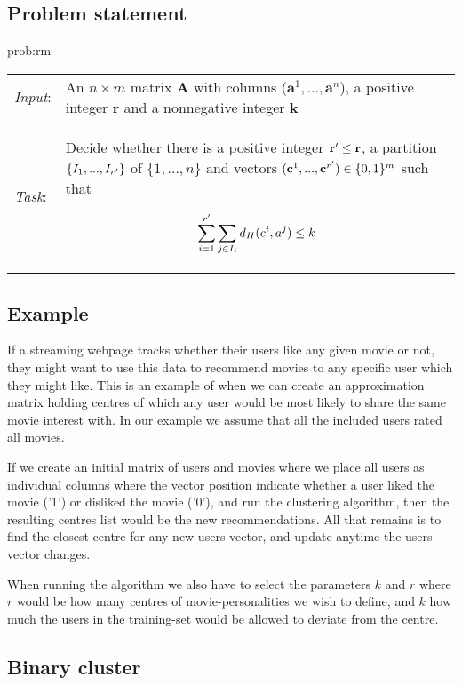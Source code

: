 \documentclass[a4paper]{article}
\begin{document}
\subsection{Problem statement}
\begin{problem}{prob:rm}
    \begin{tabular}{p{}p{}}
    \textit{Input}: & An $n \times m$ matrix \textbf{A} with columns 
    ($\textbf{a}^1,...,\textbf{a}^n$), a positive integer $\textbf{r}$ and a nonnegative 
    integer $\textbf{k}$\\
    
    \textit{Task}: & Decide whether there is a positive integer $\textbf{r}\sp{\prime} \leq 
    \textbf{r}$, a partition $\{I_1, ..., I_{r\sp{\prime}}\}$ of $\{1,...,n\}$ and vectors 
    $(\textbf{c}^1,...,\textbf{c}^{r\sp{\prime}}) \in \{0,1\}^m$ such that
    
    \[
        \sum_{i = 1}^{r\sp{\prime}} \sum_{j \in I_i} d_H(c^i, a^j) \leq k
    \]
    \end{tabular}
\end{problem}

\subsection{Example}
If a streaming webpage tracks whether their users like any given movie or not, they might want 
to use this data to recommend movies to any specific user which they might like. This is an
example of when we can create an approximation matrix holding centres of which any user would
be most likely to share the same movie interest with. In our example we assume that all the
included users rated all movies.


If we create an initial matrix of users and movies where we place all users as individual 
columns where the vector position indicate whether a user liked the movie ('1') or disliked the 
movie ('0'), and run the clustering algorithm, then the resulting centres list would be the 
new recommendations. All that remains is to find the closest centre for any new users vector,
and update anytime the users vector changes. 


When running the algorithm we also have to select the parameters $k$ and $r$ where $r$ would be
how many centres of movie-personalities we wish to define, and $k$ how much the users in
the training-set would be allowed to deviate from the centre.

\subsection{Binary cluster}
\end{document}
